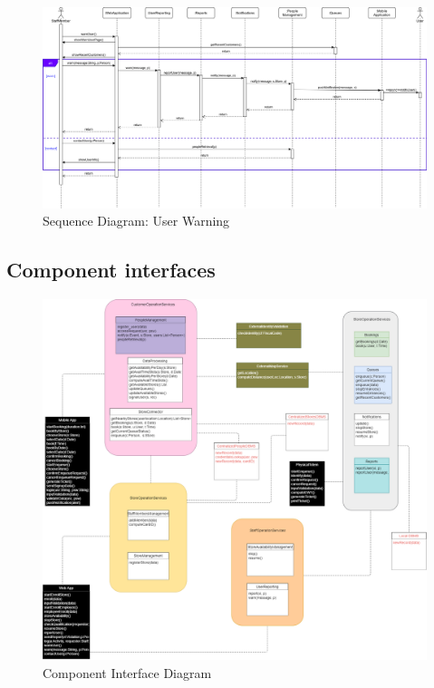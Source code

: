 \begin{landscape}
\begin{figure}[H]
	\includegraphics[width=\linewidth]{../Diagrams/Sequence/sequence_user_warn.png}
	\caption{Sequence Diagram: User Warning}
	\label{fig:sUserWarn}
\end{figure}

\end{landscape}
\subsection{Component interfaces}
\begin{figure}[H]
	\includegraphics[width=\linewidth]{../Diagrams/Component Interface.png}
	\caption{Component Interface Diagram}
	\label{fig:CompInt}
\end{figure}
